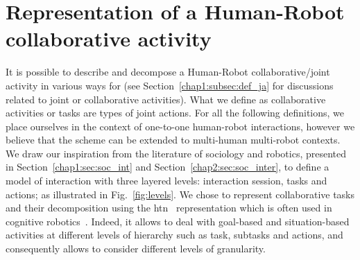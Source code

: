 \documentclass[a4paper,11pt,twoside]{StyleThese}
\begin{document}
\section{Representation of a Human-Robot collaborative activity}\label{chap5:sec:levels}
It is possible to describe and decompose a Human-Robot collaborative/joint activity in various ways for (see Section~\ref{chap1:subsec:def_ja} for discussions related to joint or collaborative activities). What we define as collaborative activities or tasks are types of joint actions. For all the following definitions, we place ourselves in the context of one-to-one human-robot interactions, however we  believe that the scheme can be extended to multi-human multi-robot contexts. 
We draw our inspiration from the literature of sociology and robotics, presented in Section~\ref{chap1:sec:soc_int} and Section~\ref{chap2:sec:soc_inter}, to define a model of interaction with three layered levels: interaction session, tasks and actions; as illustrated in Fig.~\ref{fig:levels}. We chose to represent collaborative tasks and their decomposition using the \acrfull{htn}~\cite{ghallab_2016_automated} representation which is often used in cognitive robotics~\cite{ingrand-2017,lallement_2014_hatp, buisan_2021_human}. Indeed, it allows to deal with goal-based and situation-based activities at different levels of hierarchy such as task, subtasks and actions, and consequently allows to consider different levels of granularity. 

\end{document}
